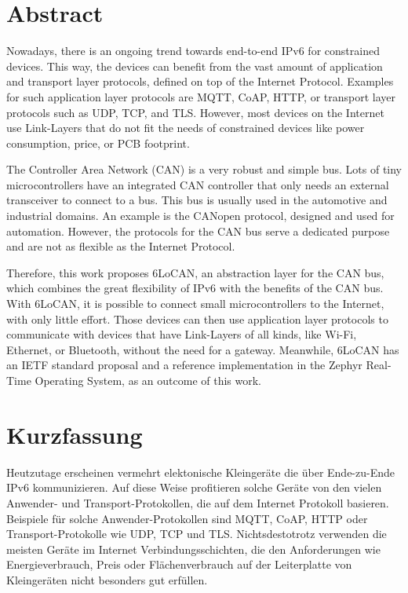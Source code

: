 \section*{Abstract}
\label{cha:abstract}

Nowadays, there is an ongoing trend towards end-to-end IPv6 for constrained devices.
This way, the devices can benefit from the vast amount of application and transport layer protocols, defined on top of the Internet Protocol.
Examples for such application layer protocols are MQTT, CoAP, HTTP, or transport layer protocols such as UDP, TCP, and TLS.
However, most devices on the Internet use Link-Layers that do not fit the needs of constrained devices like power consumption, price, or PCB footprint.

The Controller Area Network (CAN) is a very robust and simple bus.
Lots of tiny microcontrollers have an integrated CAN controller that only needs an external transceiver to connect to a bus.
This bus is usually used in the automotive and industrial domains.
An example is the CANopen protocol, designed and used for automation.
However, the protocols for the CAN bus serve a dedicated purpose and are not as flexible as the Internet Protocol.

Therefore, this work proposes 6LoCAN, an abstraction layer for the CAN bus, which combines the great flexibility of IPv6 with the benefits of the CAN bus.
With 6LoCAN, it is possible to connect small microcontrollers to the Internet, with only little effort.
Those devices can then use application layer protocols to communicate with devices that have Link-Layers of all kinds, like Wi-Fi, Ethernet, or Bluetooth, without the need for a gateway.
Meanwhile, 6LoCAN has an IETF standard proposal and a reference implementation in the Zephyr Real-Time Operating System, as an outcome of this work.

\newpage

\section*{Kurzfassung}
Heutzutage erscheinen vermehrt elektonische Kleingeräte die über Ende-zu-Ende IPv6 kommunizieren.
Auf diese Weise profitieren solche Geräte von den vielen Anwender- und Transport-Protokollen,
die auf dem Internet Protokoll basieren.
Beispiele für solche Anwender-Protokollen sind MQTT, CoAP, HTTP oder Transport-Protokolle wie UDP, TCP und TLS.
Nichtsdestotrotz verwenden die meisten Geräte im Internet Verbindungsschichten, die den Anforderungen
wie Energieverbrauch, Preis oder Flächenverbrauch auf der Leiterplatte von Kleingeräten nicht besonders gut erfüllen.

